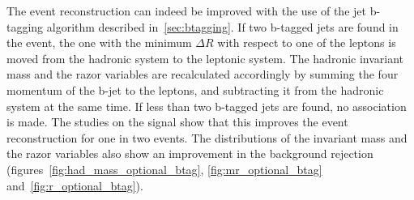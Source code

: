 The event reconstruction can indeed be improved with the use of the jet
b-tagging algorithm described in~\ref{sec:btagging}. If two b-tagged jets
are found in the event, the one with the minimum $\Delta R$ with respect to
one of the leptons is moved from the hadronic system to the leptonic system.
The hadronic invariant mass and the razor variables are recalculated
accordingly by summing the four momentum of the b-jet to the leptons, and
subtracting it from the hadronic system at the same time.
If less than two b-tagged jets are found, no association is made.
The studies on the signal show that this improves the event reconstruction
for one in two events. The distributions of the invariant mass and the razor
variables also show an improvement in the background rejection
(figures~\ref{fig:had_mass_optional_btag}, \ref{fig:mr_optional_btag}
and~\ref{fig:r_optional_btag}).

